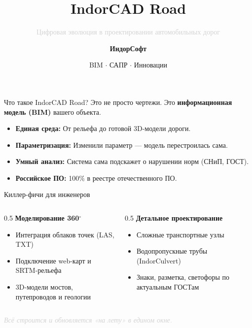 \documentclass[aspectratio=169]{beamer}
\title{\Huge \textbf{IndorCAD Road}}
\subtitle{\vspace{0.5cm}\large \textcolor{LightGray}{Цифровая эволюция в проектировании автомобильных дорог}}
\author{\textbf{ИндорСофт}}
\date{\textcolor{NeonCyan}{BIM $\cdot$ САПР $\cdot$ Инновации}}
\begin{document}
{
\begin{frame}[plain]
    \titlepage
\end{frame}
}

\begin{frame}{Что такое IndorCAD Road?}
    \Large
    Это не просто чертежи. Это \textbf{\textcolor{NeonCyan}{информационная модель (BIM)}} вашего объекта.
    \vspace{0.5cm}
    \normalsize
    \begin{itemize}
        \item \textbf{Единая среда:} От рельефа до готовой 3D-модели дороги.
        \item \textbf{Параметризация:} Изменили параметр — модель перестроилась сама.
        \item \textbf{Умный анализ:} Система сама подскажет о нарушении норм (СНиП, ГОСТ).
        \item \textbf{Российское ПО:} 100\% в реестре отечественного ПО.
    \end{itemize}
\end{frame}

\begin{frame}{Киллер-фичи для инженеров}
    \begin{columns}
        \begin{column}{0.5\textwidth}
            \textbf{\textcolor{NeonCyan}{Моделирование 360$^\circ$}}
            \begin{itemize}
                \item Интеграция облаков точек (LAS, TXT)
                \item Подключение web-карт и SRTM-рельефа
                \item 3D-модели мостов, путепроводов и геологии
            \end{itemize}
        \end{column}
        \begin{column}{0.5\textwidth}
            \textbf{\textcolor{VibrantOrange}{Детальное проектирование}}
            \begin{itemize}
                \item Сложные транспортные узлы
                \item Водопропускные трубы (IndorCulvert)
                \item Знаки, разметка, светофоры по актуальным ГОСТам
            \end{itemize}
        \end{column}
    \end{columns}
    \vspace{0.8cm}
    \begin{center}
        \textit{\textcolor{LightGray}{Всё строится и обновляется «на лету» в едином окне.}}
    \end{center}
\end{frame}
\end{document}
